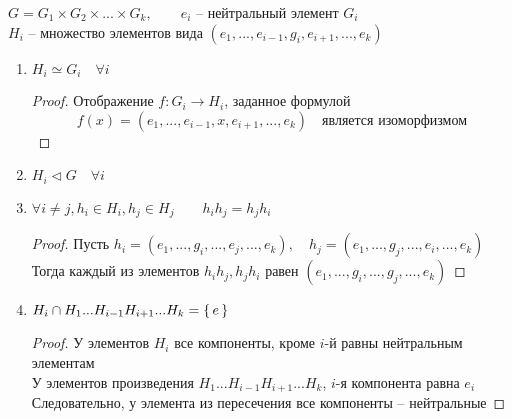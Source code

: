 \begin{properties}
	$ G = G_1 \times G_2 \times ... \times G_k, \qquad e_i $ -- нейтральный элемент $ G_i $ \\
	$ H_i $ -- множество элементов вида $ (e_1, ..., e_{i - 1}, g_i, e_{i + 1}, ..., e_k) $
	\begin{enumerate}
		\item $ H_i \simeq G_i \quad \forall i $
		\begin{proof}
			Отображение $ f : G_i \to H_i $, заданное формулой
			$$ f(x) = (e_1, ..., e_{i - 1}, x, e_{i + 1}, ..., e_k) \quad \text{является изоморфизмом} $$
		\end{proof}
		\item $ H_i \vartriangleleft G \quad \forall i $
		\item $ \forall i \ne j, h_i \in H_i, h_j \in H_j \qquad h_ih_j = h_jh_i $
		\begin{proof}
			Пусть $ h_i = (e_1, ..., g_i, ..., e_j, ..., e_k), \quad h_j = (e_1, ..., g_j, ..., e_i, ..., e_k) $ \\
			Тогда каждый из элементов $ h_ih_j, h_jh_i $ равен $ (e_1, ..., g_i, ..., g_j, ..., e_k) $
		\end{proof}
		\item $ H_i \cap H_1...H_{i - 1}H_{i + 1}...H_k = \set{e} $
		\begin{proof}
			У элементов $ H_i $ все компоненты, кроме $ i $-й равны нейтральным элементам \\
			У элементов произведения $ H_1...H_{i - 1}H_{i + 1}...H_k $, $ i $-я компонента равна $ e_i $ \\
			Следовательно, у элемента из пересечения все компоненты -- нейтральные
		\end{proof}

\end{enumerate}
\end{properties}
